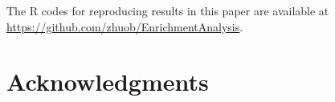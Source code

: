 \documentclass[a4,center,fleqn]{NAR}
\begin{document}
	 The R codes for reproducing results in this paper are available at
	 \url{https://github.com/zhuob/EnrichmentAnalysis}.
		
		
	
	
	
	
	\section{Acknowledgments}\label{section:acknowledgment}
	
\end{document}
